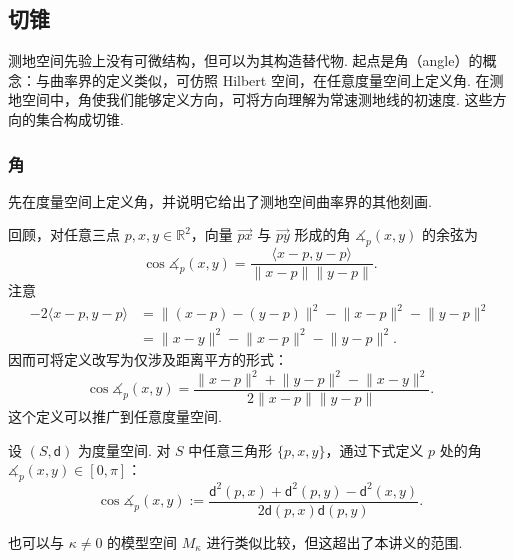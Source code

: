 \subsection{切锥}\label{sec:7.3}
测地空间先验上没有可微结构，但可以为其构造替代物. 起点是角（angle）的概念：与曲率界的定义类似，可仿照 Hilbert 空间，在任意度量空间上定义角. 在测地空间中，角使我们能够定义方向，可将方向理解为常速测地线的初速度. 这些方向的集合构成切锥.

\subsubsection{角}\label{sec:7.3.1}
先在度量空间上定义角，并说明它给出了测地空间曲率界的其他刻画.

回顾，对任意三点 $p,x,y\in\mathbb R^2$，向量 $\overrightarrow{px}$ 与 $\overrightarrow{py}$ 形成的角 $\measuredangle_p(x,y)$ 的余弦为
$$\cos\measuredangle_p(x,y)=\frac{\langle x-p,y-p\rangle}{\lVert x-p\rVert\lVert y-p\rVert}.$$
注意
$$\begin{aligned}
-2\langle x-p,y-p\rangle
&=\lVert(x-p)-(y-p)\rVert^2-\lVert x-p\rVert^2-\lVert y-p\rVert^2\\
&=\lVert x-y\rVert^2-\lVert x-p\rVert^2-\lVert y-p\rVert^2.
\end{aligned}$$
因而可将定义改写为仅涉及距离平方的形式：
$$\cos\measuredangle_p(x,y)=\frac{\lVert x-p\rVert^2+\lVert y-p\rVert^2-\lVert x-y\rVert^2}{2\lVert x-p\rVert\lVert y-p\rVert}.$$
这个定义可以推广到任意度量空间.
\begin{definition}\label{def:7.16}
设 $(S,\mathsf d)$ 为度量空间. 对 $S$ 中任意三角形 $\{p,x,y\}$，通过下式定义 $p$ 处的角 $\measuredangle_p(x,y)\in[0,\pi]$：
$$\cos\measuredangle_p(x,y):=\frac{\mathsf d^2(p,x)+\mathsf d^2(p,y)-\mathsf d^2(x,y)}{2\mathsf d(p,x)\mathsf d(p,y)}.$$
\end{definition}
也可以与 $\kappa\ne0$ 的模型空间 $M_\kappa$ 进行类似比较，但这超出了本讲义的范围.

